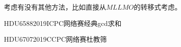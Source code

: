 


\begin{note}
	考虑有没有其他方法，比如直接从$MLLMO$的转移式考虑。
\end{note}



\vbox{}

\vbox{}

\begin{problemset}
	\item HDU6588\quad 2019ICPC网络赛\quad 经典gcd求和
	\item HDU6707\quad 2019CCPC网络赛\quad 杜教筛
\end{problemset}